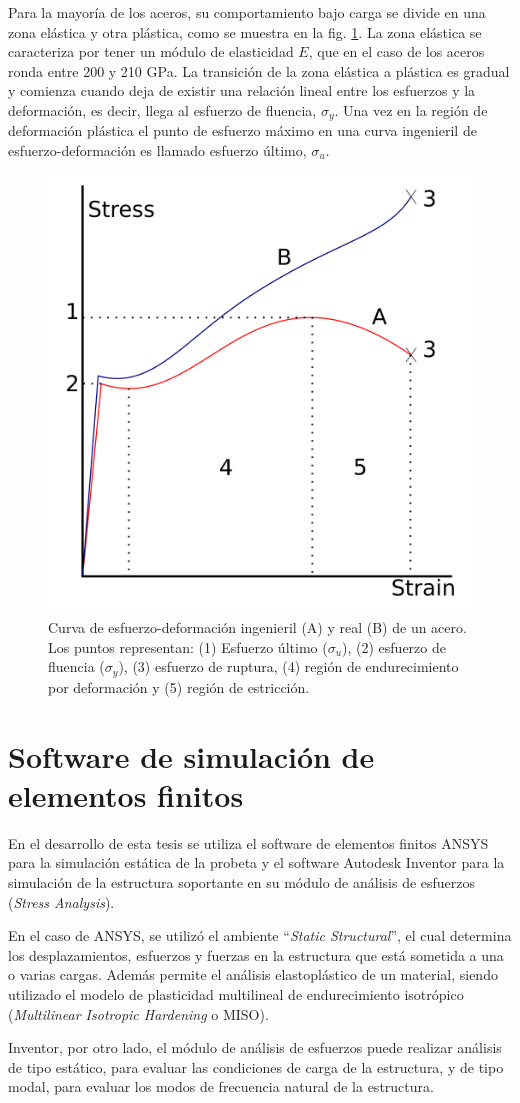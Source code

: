 Para la mayoría de los aceros, su comportamiento bajo carga se divide en una zona elástica y otra plástica, como se muestra en la fig. \ref{fig:esf-def_curve}. La zona elástica se caracteriza por tener un módulo de elasticidad $E$, que en el caso de los aceros ronda entre 200 y 210 GPa. La transición de la zona elástica a plástica es gradual y comienza cuando deja de existir una relación lineal entre los esfuerzos y la deformación, es decir, llega al esfuerzo de fluencia, $\sigma_y$. Una vez en la región de deformación plástica el punto de esfuerzo máximo en una curva ingenieril de esfuerzo-deformación es llamado esfuerzo último, $\sigma_u$.

\begin{figure}[h!]
\centering
\includegraphics[width=0.5\linewidth]{Imagenes/strain-stress_curve.png}
\caption{Curva de esfuerzo-deformación ingenieril (A) y real (B) de un acero. Los puntos representan: (1) Esfuerzo último ($\sigma_u$), (2) esfuerzo de fluencia ($\sigma_y$), (3) esfuerzo de ruptura, (4) región de endurecimiento por deformación y (5) región de estricción. \cite{richfield}}
\label{fig:esf-def_curve}
\end{figure}

\section{Software de simulación de elementos finitos}

En el desarrollo de esta tesis se utiliza el software de elementos finitos ANSYS para la simulación estática de la probeta y el software Autodesk Inventor para la simulación de la estructura soportante en su módulo de análisis de esfuerzos (\textit{Stress Analysis}).

En el caso de ANSYS, se utilizó el ambiente ``\textit{Static Structural}'', el cual determina los desplazamientos, esfuerzos y fuerzas en la estructura que está sometida a una o varias cargas. Además permite el análisis elastoplástico de un material, siendo utilizado el modelo de plasticidad multilineal de endurecimiento isotrópico (\textit{Multilinear Isotropic Hardening} o MISO). 

Inventor, por otro lado, el módulo de análisis de esfuerzos puede realizar análisis de tipo estático, para evaluar las condiciones de carga de la estructura, y de tipo modal, para evaluar los modos de frecuencia natural de la estructura.


